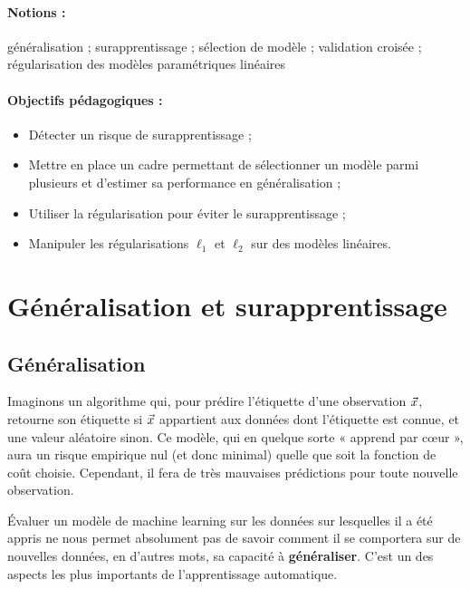 \label{chap:generalisation}

\paragraph{Notions :} généralisation ; surapprentissage ; sélection de modèle
; validation croisée ; régularisation des modèles paramétriques linéaires
\paragraph{Objectifs pédagogiques :} 
\begin{itemize}      
  \setlength{\itemsep}{3pt}
\item Détecter un risque de surapprentissage ;
\item Mettre en place un cadre permettant de sélectionner un modèle parmi
  plusieurs et d'estimer sa performance en généralisation ;
\item Utiliser la régularisation pour éviter le surapprentissage ;
\item Manipuler les régularisations $\ell_1$ et $\ell_2$ sur des modèles linéaires.
\end{itemize}

\section{Généralisation et surapprentissage}
\subsection{Généralisation}
Imaginons un algorithme qui, pour prédire l'étiquette d'une observation $\xx$,
retourne son étiquette si $\xx$ appartient aux données dont l'étiquette est
connue, et une valeur aléatoire sinon. Ce modèle, qui en quelque sorte «
apprend par c\oe{}ur », aura un risque empirique nul (et donc minimal) quelle
que soit la fonction de coût choisie. Cependant, il fera de très mauvaises
prédictions pour toute nouvelle observation.

\begin{encadre} {Évaluer un modèle de machine learning sur
    les données sur lesquelles il a été appris ne nous permet absolument pas de
    savoir comment il se comportera sur de nouvelles données, en d'autres mots,
    sa capacité à \textbf{généraliser}. C'est un des aspects les plus
    importants de l'apprentissage automatique.}
\end{encadre}

